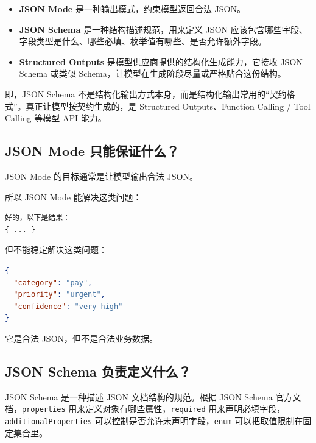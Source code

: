 \documentclass[9pt,a4paper,twocolumn]{ctexart}
\begin{document}
\begin{itemize}[itemsep=1pt, topsep=2pt]
  \item \textbf{JSON Mode} 是一种输出模式，约束模型返回合法 JSON。
  \item \textbf{JSON Schema} 是一种结构描述规范，用来定义 JSON 应该包含哪些字段、字段类型是什么、哪些必填、枚举值有哪些、是否允许额外字段。
  \item \textbf{Structured Outputs} 是模型供应商提供的结构化生成能力，它接收 JSON Schema 或类似 Schema，让模型在生成阶段尽量或严格贴合这份结构。
\end{itemize}


即，JSON Schema 不是结构化输出方式本身，而是结构化输出常用的“契约格式”。真正让模型按契约生成的，是 Structured Outputs、Function Calling / Tool Calling 等模型 API 能力。



\subsection*{JSON Mode 只能保证什么？}


JSON Mode 的目标通常是让模型输出合法 JSON。



所以 JSON Mode 能解决这类问题：



\begin{lstlisting}
好的，以下是结果：
{ ... }
\end{lstlisting}



但不能稳定解决这类问题：



\begin{lstlisting}[language=json]
{
  "category": "pay",
  "priority": "urgent",
  "confidence": "very high"
}
\end{lstlisting}



它是合法 JSON，但不是合法业务数据。



\subsection*{JSON Schema 负责定义什么？}


JSON Schema 是一种描述 JSON 文档结构的规范。根据 JSON Schema 官方文档，\texttt{properties} 用来定义对象有哪些属性，\texttt{required} 用来声明必填字段，\texttt{additionalProperties} 可以控制是否允许未声明字段，\texttt{enum} 可以把取值限制在固定集合里。
\end{document}
